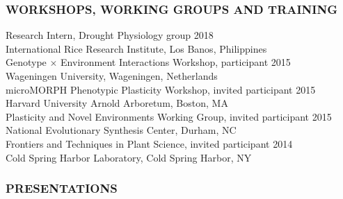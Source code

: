 \documentclass[12pt,english]{article}
\begin{document}

\subsubsection*{WORKSHOPS, WORKING GROUPS AND TRAINING}
\vspace{-0.5ex}
\hspace*{1.0em} Research Intern, Drought Physiology group
\hfill
2018
\vspace{1ex}\\
\hspace*{2.0em}  International Rice Research Institute, Los Banos, Philippines
\vspace{1ex}\\
\hspace*{1.0em} Genotype $\times$ Environment Interactions Workshop, participant
\hfill
2015
\vspace{1ex}\\
\hspace*{2.0em}  Wageningen University, Wageningen, Netherlands
\vspace{1ex}\\
\hspace*{1.0em} microMORPH Phenotypic Plasticity Workshop, invited participant
\hfill
2015
\vspace{1ex}\\
\hspace*{2.0em}  Harvard University Arnold Arboretum, Boston, MA
\vspace{1ex}\\
\hspace*{1.0em} Plasticity and Novel Environments Working Group, invited participant
\hfill
2015
\vspace{1ex}\\
\hspace*{2.0em}  National Evolutionary Synthesis Center, Durham, NC
\vspace{1ex}\\
\hspace*{1.0em} Frontiers and Techniques in Plant Science, invited participant
\hfill
2014
\vspace{1ex}\\
\hspace*{2.0em}  Cold Spring Harbor Laboratory, Cold Spring Harbor, NY
\vspace{1ex}


\subsubsection*{PRESENTATIONS}
\vspace{-0.5ex}
\end{document}
